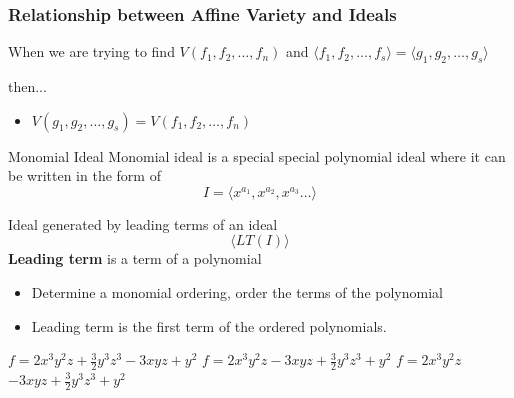 \documentclass{beamer}
\begin{document}
\begin{frame}
\frametitle{Relationship between Affine Variety and Ideals}
When we are trying to find $V(f_1, f_2, \dots,f_n)$ and $\langle f_1, f_2, \dots, f_s\rangle = \langle g_1, g_2, \dots, g_s\rangle$ 
\leavevmode
\newline

then...
\begin{itemize}
\item<1->$V( g_1, g_2, \dots, g_s) = V(f_1, f_2, \dots,f_n)$
\end{itemize}

\end{frame}


\begin{frame}{Monomial Ideal}
    Monomial ideal is a special special polynomial ideal where it can be written in the form of $$I = \langle x^{a_1}, x^{a_2}, x^{a_3} \dots\rangle$$
    \begin{itemize}
    \end{itemize}
\end{frame}


\begin{frame}{Ideal generated by leading terms of an ideal}
$$\langle LT(I)\rangle$$
\textbf{Leading term} is a term of a polynomial
\begin{itemize}
    \item<1-> Determine a monomial ordering, order the terms of the polynomial
    \item Leading term is the first term of the ordered polynomials. 
\end{itemize}
\begin{Examples}
    $f=2x^3y^2z + \frac{3}{2}y^3z^3 -3xyz +y^2$ \pause
    \newline
    $f=2x^3y^2z-3xyz + \frac{3}{2}y^3z^3 +y^2$ \pause
    \newline
    $f=$\alert{$2x^3y^2z$}$-3xyz + \frac{3}{2}y^3z^3 +y^2$ 
\end{Examples}

\end{frame}
\end{document}
